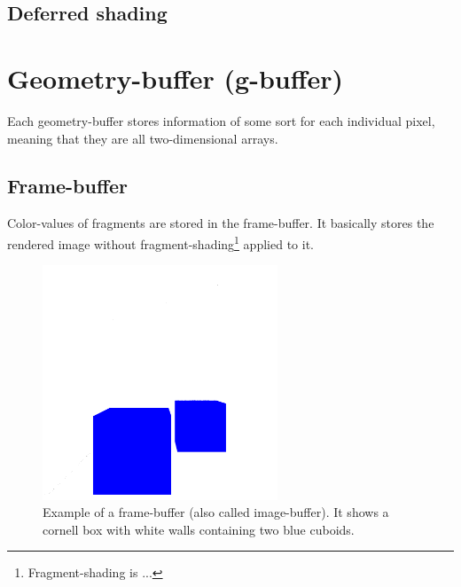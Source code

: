 \documentclass{ACGSeminar}
\begin{document}
	\subsection{Deferred shading}

\section{Geometry-buffer (g-buffer)}
	Each geometry-buffer stores information of some sort for each individual pixel, meaning that they are all two-dimensional arrays.
	\subsection{Frame-buffer}%
		Color-values of fragments are stored in the frame-buffer. It basically stores the rendered image without fragment-shading\footnote{Fragment-shading is ...} applied to it.%
		\begin{figure}[htb!]%
			\begin{center}%
				\includegraphics[width=7cm]{img/frame_buffer.png}
			\end{center}%
			\caption{Example of a frame-buffer (also called image-buffer). It shows a cornell box with white walls containing two blue cuboids.}%
			\label{fig:frame_buffer}%
		\end{figure}%
\end{document}
